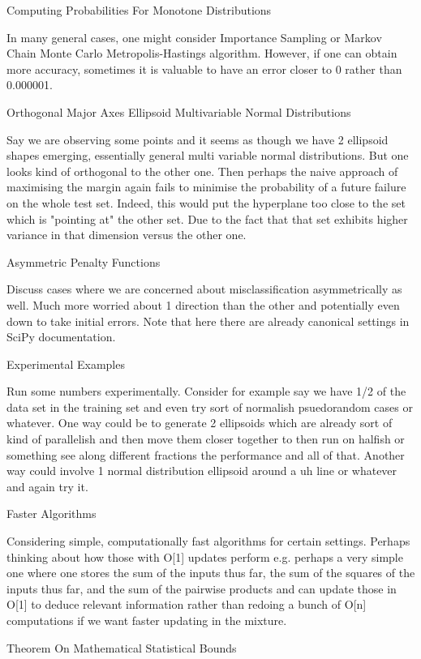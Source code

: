 	Computing Probabilities For Monotone Distributions

In many general cases, one might consider Importance Sampling or Markov Chain Monte Carlo Metropolis-Hastings algorithm. However, if one can obtain more accuracy, sometimes it is valuable to have an error closer to 0 rather than 0.000001.

	Orthogonal Major Axes Ellipsoid Multivariable Normal Distributions

Say we are observing some points and it seems as though we have 2 ellipsoid shapes emerging, essentially general multi variable normal distributions. But one looks kind of orthogonal to the other one. Then perhaps the naive approach of maximising the margin again fails to minimise the probability of a future failure on the whole test set. Indeed, this would put the hyperplane too close to the set which is "pointing at" the other set. Due to the fact that that set exhibits higher variance in that dimension versus the other one.

	Asymmetric Penalty Functions

Discuss cases where we are concerned about misclassification asymmetrically as well. Much more worried about 1 direction than the other and potentially even down to take initial errors. Note that here there are already canonical settings in SciPy documentation.

	Experimental Examples

Run some numbers experimentally. Consider for example say we have 1/2 of the data set in the training set and even try sort of normalish psuedorandom cases or whatever. One way could be to generate 2 ellipsoids which are already sort of kind of parallelish and then move them closer together to then run on halfish or something see along different fractions the performance and all of that. Another way could involve 1 normal distribution ellipsoid around a uh line or whatever and again try it.

	Faster Algorithms

Considering simple, computationally fast algorithms for certain settings. Perhaps thinking about how those with O[1] updates perform e.g. perhaps a very simple one where one stores the sum of the inputs thus far, the sum of the squares of the inputs thus far, and the sum of the pairwise products and can update those in O[1] to deduce relevant information rather than redoing a bunch of O[n] computations if we want faster updating in the mixture.

	Theorem On Mathematical Statistical Bounds

